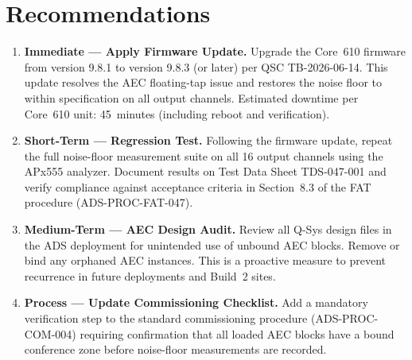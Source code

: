 \section{Recommendations}

\begin{enumerate}[leftmargin=*, label=\textbf{R-\arabic*:}, ref=R-\arabic*, itemsep=6pt]

  \item \textbf{Immediate --- Apply Firmware Update.} Upgrade the Core~610
        firmware from version 9.8.1 to version 9.8.3 (or later) per QSC
        TB-2026-06-14. This update resolves the AEC floating-tap issue and
        restores the noise floor to within specification on all output
        channels. Estimated downtime per Core~610 unit: 45~minutes (including
        reboot and verification).

  \item \textbf{Short-Term --- Regression Test.} Following the firmware update,
        repeat the full noise-floor measurement suite on all 16 output channels
        using the APx555 analyzer. Document results on Test Data Sheet
        TDS-047-001 and verify compliance against acceptance criteria in
        Section~8.3 of the FAT procedure (ADS-PROC-FAT-047).

  \item \textbf{Medium-Term --- AEC Design Audit.} Review all Q-Sys design files
        in the ADS deployment for unintended use of unbound AEC blocks. Remove
        or bind any orphaned AEC instances. This is a proactive measure to
        prevent recurrence in future deployments and Build~2 sites.

  \item \textbf{Process --- Update Commissioning Checklist.} Add a mandatory
        verification step to the standard commissioning procedure
        (ADS-PROC-COM-004) requiring confirmation that all loaded AEC blocks
        have a bound conference zone before noise-floor measurements are
        recorded.

\end{enumerate}

